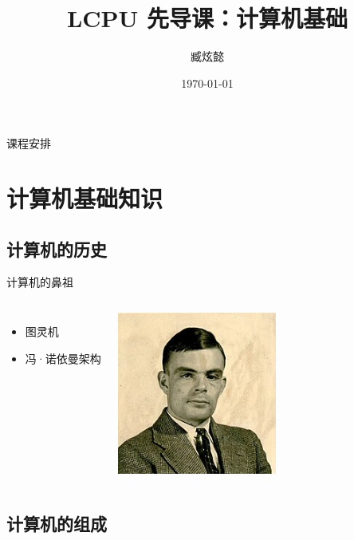 \documentclass{beamer}
\title{LCPU 先导课：计算机基础}
\author{臧炫懿}
\institute{北京大学 信息科学技术学院}
\date{\today}
\begin{document}
\frame{\titlepage}

\begin{frame}{课程安排}
    \tableofcontents
\end{frame}

\section{计算机基础知识}

\subsection{计算机的历史}
\begin{frame}{计算机的鼻祖}
    \begin{columns}[T]
            \begin{itemize}
                \item <1->图灵机
                \item <2->冯·诺依曼架构
            \end{itemize}

            \includegraphics[width=0.9\textwidth]{1-1-Turing.jpg}
    \end{columns}
\end{frame}

\subsection{计算机的组成}
\end{document}
